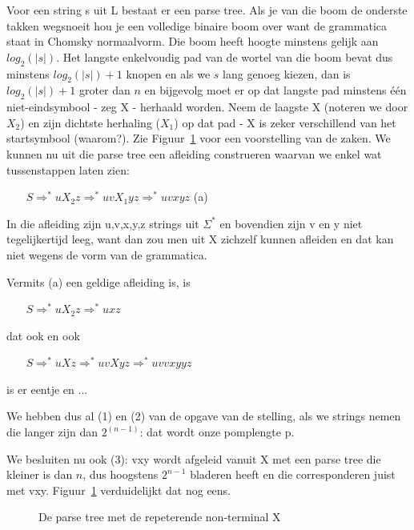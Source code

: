 Voor een string s uit L bestaat er een parse tree.
Als je van die boom de onderste takken wegsnoeit hou je een volledige
binaire boom over want de grammatica staat in Chomsky normaalvorm. Die
boom heeft hoogte minstens gelijk aan $log_2(|s|)$. Het langste
enkelvoudig pad van de wortel van die boom bevat dus minstens
$log_2(|s|) + 1$ knopen en als we $s$ lang genoeg kiezen, dan is
$log_2(|s|) + 1$ groter dan $n$ en bijgevolg moet er op dat langste
pad minstens \'{e}\'{e}n niet-eindsymbool - zeg X - herhaald
worden. Neem de laagste X (noteren we door $X_2$) en zijn dichtste
herhaling ($X_1$) op dat pad - X is zeker verschillend van het
startsymbool (waarom?). Zie Figuur~\ref{parsetree2} voor een
voorstelling van de zaken. We kunnen nu uit die parse tree een
afleiding construeren waarvan we enkel wat tussenstappen laten zien:


$~~~~~~~~S \Rightarrow^* uX_2z \Rightarrow^* uvX_1yz \Rightarrow^* uvxyz$ (a)


In die afleiding zijn u,v,x,y,z strings uit $\Sigma^*$ en bovendien
zijn v en y niet tegelijkertijd leeg, want dan zou men uit X zichzelf
kunnen afleiden en dat kan niet wegens de vorm van de grammatica.

Vermits (a) een geldige afleiding is, is


$~~~~~~~~S \Rightarrow^* uX_2z \Rightarrow^* uxz$


dat ook en ook


$~~~~~~~~S \Rightarrow^* uXz \Rightarrow^* uvXyz \Rightarrow^* uvvxyyz$


is er eentje en ...


We hebben dus al (1) en (2) van de opgave van de stelling, als we
strings nemen die langer zijn dan $2^{(n-1)}$: dat wordt onze pomplengte
p.


We besluiten nu ook (3): vxy wordt afgeleid vanuit X met een parse
tree die kleiner is dan $n$, dus hoogstens $2^{n-1}$ bladeren heeft en die
corresponderen juist met vxy. Figuur~\ref{parsetree2} verduidelijkt
dat nog eens.
\prend
\begin{figure}[h]
\caption{De parse tree met de repeterende non-terminal X \label{parsetree2}}
\end{figure}


